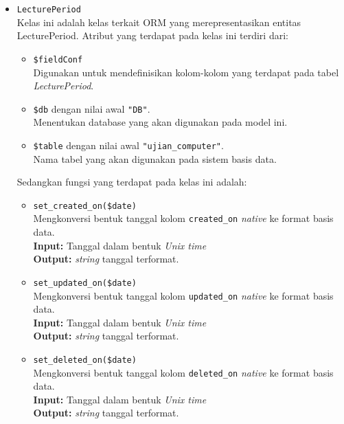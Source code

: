\begin{itemize}
        \item \texttt{LecturePeriod} \\
            Kelas ini adalah kelas terkait ORM yang merepresentasikan entitas
            LecturePeriod. Atribut yang terdapat pada kelas ini terdiri dari:
            \begin{itemize}
                \item \texttt{\$fieldConf} \\
                    Digunakan untuk mendefinisikan kolom-kolom yang terdapat
                    pada tabel \textit{LecturePeriod}.
                \item \texttt{\$db} dengan nilai awal \texttt{"DB"}. \\
                    Menentukan database yang akan digunakan pada model ini.
                \item \texttt{\$table} dengan nilai awal
                \texttt{"ujian\_computer"}. \\
                    Nama tabel yang akan digunakan pada sistem basis data. 
            \end{itemize}
            Sedangkan fungsi yang terdapat pada kelas ini adalah:
            \begin{itemize}
                \item \texttt{set\_created\_on(\$date)} \\
                    Mengkonversi bentuk tanggal kolom \texttt{created\_on}
                    \textit{native} ke format basis data. \\
                    \textbf{Input:} Tanggal dalam bentuk \textit{Unix time}\\
                    \textbf{Output:} \textit{string} tanggal terformat.
                
                \item \texttt{set\_updated\_on(\$date)} \\
                    Mengkonversi bentuk tanggal kolom \texttt{updated\_on}
                    \textit{native} ke format basis data. \\
                    \textbf{Input:} Tanggal dalam bentuk \textit{Unix time}\\
                    \textbf{Output:} \textit{string} tanggal terformat.
                    
                \item \texttt{set\_deleted\_on(\$date)} \\
                    Mengkonversi bentuk tanggal kolom \texttt{deleted\_on}
                    \textit{native} ke format basis data. \\
                    \textbf{Input:} Tanggal dalam bentuk \textit{Unix time}\\
                    \textbf{Output:} \textit{string} tanggal terformat.
                    

\end{itemize}
\end{itemize}
